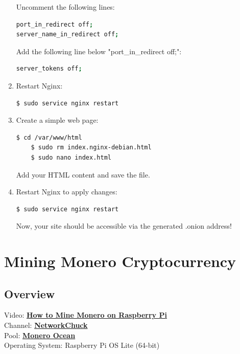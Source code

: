\documentclass[a4paper,12pt]{article}
\begin{document}
\begin{enumerate}
Uncomment the following lines:
\begin{lstlisting}[language=bash, breaklines=true, breakatwhitespace=true, columns=fullflexible]
port_in_redirect off;
server_name_in_redirect off;
\end{lstlisting}

Add the following line below "port\_in\_redirect off;":
\begin{lstlisting}[language=bash, breaklines=true, breakatwhitespace=true, columns=fullflexible]
server_tokens off;
\end{lstlisting}

    \item Restart Nginx:
    \begin{lstlisting}[language=bash, breaklines=true, breakatwhitespace=true, columns=fullflexible]
    $ sudo service nginx restart
    \end{lstlisting}

    \item Create a simple web page:
    \begin{lstlisting}[language=bash, breaklines=true, breakatwhitespace=true, columns=fullflexible]
    $ cd /var/www/html
    $ sudo rm index.nginx-debian.html
    $ sudo nano index.html
    \end{lstlisting}
    Add your HTML content and save the file.

\item Restart Nginx to apply changes:
\begin{lstlisting}[language=bash, breaklines=true, breakatwhitespace=true, columns=fullflexible]
$ sudo service nginx restart
\end{lstlisting}
Now, your site should be accessible via the generated .onion address!
   
\end{enumerate}

\section{Mining Monero Cryptocurrency}

\subsection{Overview}
Video: \href{https://www.youtube.com/watch?v=hHtGN_JzoP8}{\textbf{\color{blue}How to Mine Monero on Raspberry Pi}} \\
Channel: \href{https://www.youtube.com/@NetworkChuck}{\textbf{\color{blue}NetworkChuck}} \\
Pool: \href{https://moneroocean.stream/}{\textbf{\color{blue}Monero Ocean}} \\
Operating System: Raspberry Pi OS Lite (64-bit)
\end{document}
